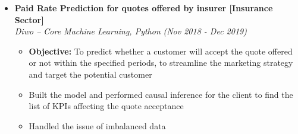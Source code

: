 \documentclass[a4paper,10pt]{article}
\newcommand{\isep}{-2 pt}
\begin{document}
\begin{itemize}
\item \textbf{Paid Rate Prediction for quotes offered by insurer [Insurance Sector]}  \\
    \emph{Diwo -- Core Machine Learning, Python} \hfill {\emph{(Nov 2018 - Dec 2019)}}
    \\[-0.5cm]
    \begin{itemize}\itemsep \isep
    	\item \textbf{Objective:} To predict whether a customer will accept the quote offered or not within the specified periods, to streamline the marketing strategy and target the potential customer 
        \item Built the model and performed causal inference for the client to find the list of KPIs affecting the quote acceptance 
        \item Handled the issue of imbalanced data
        \\ [-0.5cm]
    \end{itemize}

\end{itemize}
\end{document}
